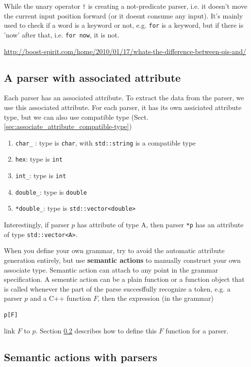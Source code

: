 While the unary operator \verb.!. is creating a not-predicate parser, i.e. it
doesn't move the current input position forward (or it doesnt consume any
input). It's mainly used to check if a word is a keyword or not, e.g. \verb!for!
is a keyword, but if there is 'now' after that, i.e. \verb!for now!, it is not.

\url{http://boost-spirit.com/home/2010/01/17/whats-the-difference-between-qis-and/}

\subsection{A parser with associated attribute}
\label{sec:associate_attribute}

Each parser has an associated attribute. To extract the data from the parser, we
use this associated attribute. For each parser, it has its own assiciated
attribute type, but we can also use compatible type
(Sect.\ref{sec:associate_attribute_compatible-type})
\begin{enumerate}
  \item \verb!char_! : type is \verb!char!, with \verb!std::string! is a
  compatible type
  \item \verb!hex!: type is \verb!int!
  \item \verb!int_!: type is \verb!int!
  \item \verb!double_!: type is \verb!double!
  \item \verb!*double_!: type is \verb!std::vector<double>!
\end{enumerate}
Interestingly, if parser $p$ has attribute of type A, then parser \verb!*p! has
an attribute of type \verb!std::vector<A>!.

When you define your own grammar, try to avoid the automatic attribute
generation entirely, but use {\bf semantic actions} to manually construct your
own associate type. Semantic action can attach to any point in the grammar
specification. A sementic action can be a plain function or a function object
that is called whenever the part of the parse succesffully recognize a token,
e.g. a parser $p$ and a C++ function $F$, then the expression (in the grammar)
\begin{verbatim}
p[F] 
\end{verbatim}
link $F$ to $p$. Section \ref{sec:semantic_action} describes how to define this
$F$ function for a parser.



\subsection{Semantic actions with parsers}
\label{sec:semantic_action}

